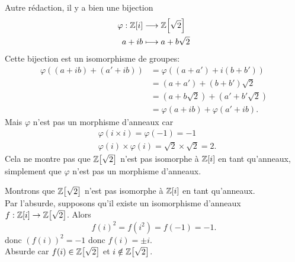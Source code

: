 {\begin{td-sol}[]
\begin{enumerate}
            Autre rédaction, il y a bien une bijection
            \begin{equation*}
                \begin{aligned}
                    \varphi : \mathbb{Z}[i] &\longrightarrow \mathbb{Z}\mathopen{}\left[\sqrt{2}\right]\mathclose{}\\
                    a+ib &\longmapsto a+b\sqrt{2}
                \end{aligned}
            \end{equation*}
            Cette bijection est un isomorphisme de groupes:
            \begin{equation*}
                \begin{aligned}
                    \varphi((a+ib) + (a'+ib))
                    &= \varphi((a+a') + i(b+b'))\\
                    &= (a+a') + (b+b')\sqrt{2}\\
                    &= (a+b\sqrt{2}) + (a'+b'\sqrt{2})\\
                    &= \varphi(a+ib) + \varphi(a'+ib).
                \end{aligned}
            \end{equation*}
            Mais \(\varphi\) n'est pas un morphisme d'anneaux car
            \begin{equation*}
                \begin{aligned}
                    & \varphi(i\times i) = \varphi(-1) = -1\\
                    & \varphi(i)\times\varphi(i) = \sqrt{2}\times\sqrt{2} = 2.
                \end{aligned}
            \end{equation*}
            Cela ne montre pas que \(\mathbb{Z}\mathopen{}\left[\sqrt{2}\right]\mathclose{}\) n'est pas isomorphe à \(\mathbb{Z}[i]\)
            en tant qu'anneaux, simplement que \(\varphi\) n'est pas un morphisme d'anneaux.

            Montrons que \(\mathbb{Z}\mathopen{}\left[\sqrt{2}\right]\mathclose{}\) n'est pas isomorphe à \(\mathbb{Z}[i]\) en tant qu'anneaux.\\
            Par l'absurde, supposons qu'il existe un isomorphisme d'anneaux
            \(f : \mathbb{Z}[i] \to \mathbb{Z}\mathopen{}\left[\sqrt{2}\right]\mathclose{}\). Alors 
            \begin{equation*}
                {f(i)}^2 = f(i^2) = f(-1) = -1.
            \end{equation*}
            donc \({\left(f(i)\right)}^2=-1\) donc \(f(i) = \pm i\).\\ 
            Absurde car \(f(i)\in \mathbb{Z}\mathopen{}\left[\sqrt{2}\right]\mathclose{}\) et \(i\notin\mathbb{Z}\mathopen{}\left[\sqrt{2}\right]\mathclose{}\).


\end{enumerate}
\end{td-sol}}
